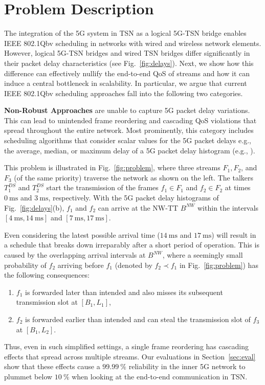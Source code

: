 \section{Problem Description} \label{sec:problem_description}
The integration of the 5G system in TSN as a logical 5G-TSN bridge enables IEEE 802.1Qbv scheduling in networks with wired and wireless network elements.
However, logical 5G-TSN bridges and wired TSN bridges differ significantly in their packet delay characteristics (see Fig.~\ref{fig:delays}).
Next, we show how this difference can effectively nullify the end-to-end QoS of streams and how it can induce a central bottleneck in scalability.
In particular, we argue that current IEEE 802.1Qbv scheduling approaches fall into the following two categories.

\textbf{Non-Robust Approaches}
are unable to capture 5G packet delay variations.
This can lead to unintended frame reordering and cascading QoS violations that spread throughout the entire network.
Most prominently, this category includes scheduling algorithms that consider scalar values for the 5G packet delays \ldash e.g., the average, median, or maximum delay of a 5G packet delay histogram (e.g., \cite{9212049, 9940254}).

This problem is illustrated in Fig.~\ref{fig:problem}, where three streams $F_1, F_2$, and $F_3$ (of the same priority) traverse the network as shown on the left.
The talkers $T_1^{DS}$ and $T_2^{DS}$ start the transmission of the frames $f_1 \in F_1$ and $f_2 \in F_2$ at times $\qty{0}{\ms}$ and $\qty{3}{\ms}$, respectively. 
With the 5G packet delay histograms of Fig.~\ref{fig:delays}(b), $f_1$ and $f_2$ can arrive at the NW-TT $B^{NW}$ within the intervals $[\qty{4}{\ms}, \qty{14}{\ms}]$ and $[\qty{7}{\ms}, \qty{17}{\ms}]$.

Even considering the latest possible arrival time ($\qty{14}{\ms}$ and $\qty{17}{\ms}$) will result in a schedule that breaks down irreparably after a short period of operation.
This is caused by the overlapping arrival intervals at $B^{NW}$, where a seemingly small probability of $f_2$ arriving before $f_1$ (denoted by $f_2 \prec f_1$ in Fig.~\ref{fig:problem}) has the following consequences:
\begin{enumerate}[label=(\roman*)]
  \item $f_1$ is forwarded later than intended and also misses its subsequent transmission slot at $[B_1, L_1]$,
  \item $f_2$ is forwarded earlier than intended and can steal the transmission slot of $f_3$ at $[B_1, L_2]$.
\end{enumerate}
Thus, even in such simplified settings, a single frame reordering has cascading effects that spread across multiple streams.
Our evaluations in Section~\ref{sec:eval} show that these effects cause a $\qty{99.99}{\percent}$ reliability in the inner 5G network to plummet below $\qty{10}{\percent}$ when looking at the end-to-end communication in TSN.

